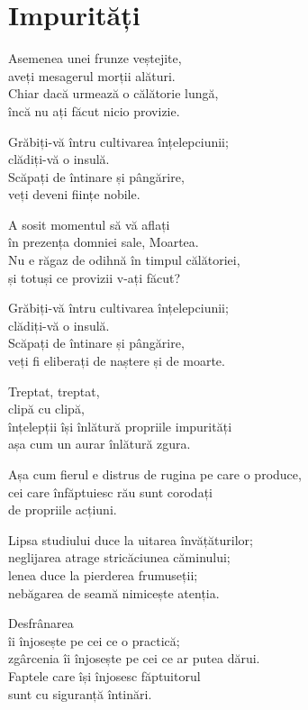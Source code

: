 
\chapter{Impurități}


Asemenea unei frunze veștejite,\\
aveți mesagerul morții alături.\\
Chiar dacă urmează o călătorie lungă,\\
încă nu ați făcut nicio provizie.


Grăbiți-vă întru cultivarea înțelepciunii;\\
clădiți-vă o insulă.\\
Scăpați de întinare și pângărire,\\
veți deveni ființe nobile.


A sosit momentul să vă aflați\\
în prezența domniei sale, Moartea.\\
Nu e răgaz de odihnă în timpul călătoriei,\\
și totuși ce provizii v-ați făcut?


Grăbiți-vă întru cultivarea înțelepciunii;\\
clădiți-vă o insulă.\\
Scăpați de întinare și pângărire,\\
veți fi eliberați de naștere și de moarte.


Treptat, treptat,\\
clipă cu clipă,\\
înțelepții își înlătură propriile impurități\\
așa cum un aurar înlătură zgura.


Așa cum fierul e distrus de rugina pe care o produce,\\
cei care înfăptuiesc rău sunt corodați\\
de propriile acțiuni.


Lipsa studiului duce la uitarea învățăturilor;\\
neglijarea atrage stricăciunea căminului;\\
lenea duce la pierderea frumuseții;\\
nebăgarea de seamă nimicește atenția.


Desfrânarea\\
îi înjosește pe cei ce o practică;\\
zgârcenia îi înjosește pe cei ce ar putea dărui.\\
Faptele care își înjosesc făptuitorul\\
sunt cu siguranță întinări.


